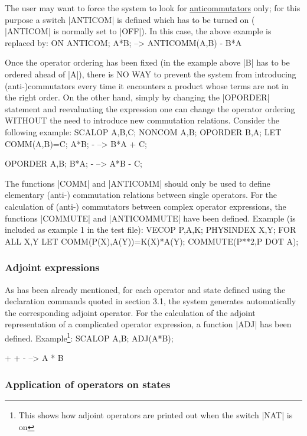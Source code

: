 The user may want to force the system to look for
\underline{anticommutators} only; for this purpose a switch |ANTICOM|
is defined which has to be turned on ( |ANTICOM| is normally set to
|OFF|). In this case, the above example is replaced by:
\begintt
ON ANTICOM;
A*B;
 -->  ANTICOMM(A,B) - B*A
\endtt

Once the operator ordering has been fixed (in the example above |B|
has to be ordered ahead of |A|),
there is NO WAY to prevent the
system from introducing (anti-)commutators  every time it encounters
a product whose terms are not in the right order. On the other hand,
simply by changing the |OPORDER| statement  and reevaluating the
expression one can change  the operator ordering WITHOUT the
need to introduce new commutation relations.
Consider the following example:
\begintt
SCALOP A,B,C;   NONCOM A,B;   OPORDER B,A;
LET COMM(A,B)=C;
A*B;
- -->  B*A + C;

OPORDER A,B;
 B*A;
- --> A*B - C;
\endtt

The functions |COMM| and |ANTICOMM| should only be used  to
define
elementary (anti-) commutation relations between single operators.
For the calculation of (anti-) commutators between complex
operator
expressions, the functions |COMMUTE|  and
|ANTICOMMUTE|  have been defined.
Example (is included as example 1 in the test file):
\begintt
VECOP P,A,K;
PHYSINDEX X,Y;
FOR ALL X,Y LET COMM(P(X),A(Y))=K(X)*A(Y);
COMMUTE(P**2,P DOT A);
\endtt

\subsubsection{Adjoint expressions}

As has been already mentioned, for each operator and state defined
using the declaration commands quoted in section 3.1, the system
generates automatically the corresponding adjoint operator. For the
calculation of the adjoint representation of a complicated
operator expression, a function  |ADJ|  has been defined.
Example\footnote{This shows how adjoint operators are printed out
when the switch |NAT| is on}:
\begintt
SCALOP A,B;
ADJ(A*B);

     +    +
- --> A  * B
\endtt

\subsubsection{Application of operators on states}

